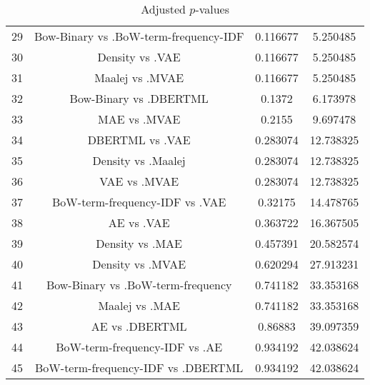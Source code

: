 \documentclass[a4paper,10pt]{article}
\begin{document}
\begin{landscape}
\begin{table}[!htp]
\begin{tabular}{cccc}
29&Bow-Binary vs .BoW-term-frequency-IDF&0.116677&5.250485\\
30&Density vs .VAE&0.116677&5.250485\\
31&Maalej vs .MVAE&0.116677&5.250485\\
32&Bow-Binary vs .DBERTML&0.1372&6.173978\\
33&MAE vs .MVAE&0.2155&9.697478\\
34&DBERTML vs .VAE&0.283074&12.738325\\
35&Density vs .Maalej&0.283074&12.738325\\
36&VAE vs .MVAE&0.283074&12.738325\\
37&BoW-term-frequency-IDF vs .VAE&0.32175&14.478765\\
38&AE vs .VAE&0.363722&16.367505\\
39&Density vs .MAE&0.457391&20.582574\\
40&Density vs .MVAE&0.620294&27.913231\\
41&Bow-Binary vs .BoW-term-frequency&0.741182&33.353168\\
42&Maalej vs .MAE&0.741182&33.353168\\
43&AE vs .DBERTML&0.86883&39.097359\\
44&BoW-term-frequency-IDF vs .AE&0.934192&42.038624\\
45&BoW-term-frequency-IDF vs .DBERTML&0.934192&42.038624\\
\hline
\end{tabular}
\caption{Adjusted $p$-values}
\end{table}

\end{landscape}
\end{document}
